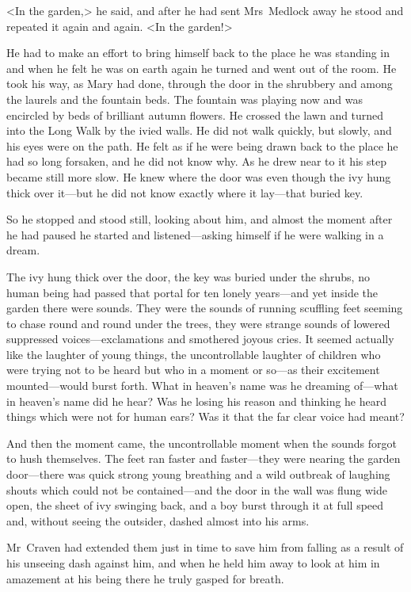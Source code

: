 <In the garden,> he said, and after he had sent Mrs~Medlock away he stood and repeated it again and again. <In the garden!>

He had to make an effort to bring himself back to the place he was standing in and when he felt he was on earth again he turned and went out of the room. He took his way, as Mary had done, through the door in the shrubbery and among the laurels and the fountain beds. The fountain was playing now and was encircled by beds of brilliant autumn flowers. He crossed the lawn and turned into the Long Walk by the ivied walls. He did not walk quickly, but slowly, and his eyes were on the path. He felt as if he were being drawn back to the place he had so long forsaken, and he did not know why. As he drew near to it his step became still more slow. He knew where the door was even though the ivy hung thick over it—but he did not know exactly where it lay—that buried key.

So he stopped and stood still, looking about him, and almost the moment after he had paused he started and listened—asking himself if he were walking in a dream.

The ivy hung thick over the door, the key was buried under the shrubs, no human being had passed that portal for ten lonely years—and yet inside the garden there were sounds. They were the sounds of running scuffling feet seeming to chase round and round under the trees, they were strange sounds of lowered suppressed voices—exclamations and smothered joyous cries. It seemed actually like the laughter of young things, the uncontrollable laughter of children who were trying not to be heard but who in a moment or so—as their excitement mounted—would burst forth. What in heaven's name was he dreaming of—what in heaven's name did he hear? Was he losing his reason and thinking he heard things which were not for human ears? Was it that the far clear voice had meant?

And then the moment came, the uncontrollable moment when the sounds forgot to hush themselves. The feet ran faster and faster—they were nearing the garden door—there was quick strong young breathing and a wild outbreak of laughing shouts which could not be contained—and the door in the wall was flung wide open, the sheet of ivy swinging back, and a boy burst through it at full speed and, without seeing the outsider, dashed almost into his arms.

Mr~Craven had extended them just in time to save him from falling as a result of his unseeing dash against him, and when he held him away to look at him in amazement at his being there he truly gasped for breath.

